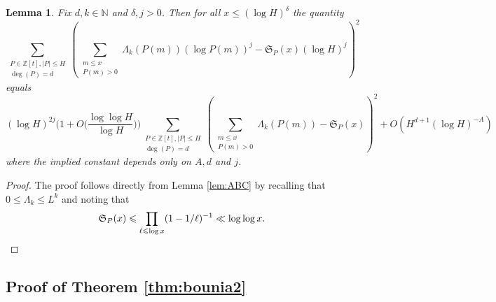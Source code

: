 \documentclass[reqno, 11pt]{amsart}
\numberwithin{equation}{section}
\newtheorem{lemma}[theorem]{Lemma}
\theoremstyle{definition}
\newcommand{\0}{\mathbf{0}}
\renewcommand{\leq}{\leqslant}
\renewcommand{\P}{\mathbb{P}}
\renewcommand{\leq}{\leqslant}
\renewcommand{\#}{\sharp}
\begin{document}
\begin{lemma}
\label{Davide Perez - Subvenite sancti dei}
Fix $d,k\in \mathbb N$ and $\delta,j>0$.  
Then for all $x\leq (\log H)^\delta$ 
the quantity 
$$
\sum_{\substack{ P\in \mathbb Z[t],|P|\leq H \\  \deg(P)=d}} 
\left( \sum_{\substack{ m\leq x\\P(m)>0} } \Lambda_k(P(m)) 
(\log P(m))^j - \mathfrak S_P(x) (\log H)^j\right)^2
$$equals 
$$  (\log H)^{2j}\Big( 1   +O\Big(\frac{\log \log H}{\log  H}
\Big)\Big)
\sum_{\substack{ P\in \mathbb Z[t],|P|\leq H \\  \deg(P)=d}} 
\left( \sum_{\substack{ m\leq x\\P(m)>0} } \Lambda_k(P(m)) 
  -\mathfrak S_P(x)  \right)^2 +O(H^{d+1} (\log H)^{-A} )
$$where the implied constant depends only on $A,d$ and $j$.
\end{lemma}
\begin{proof} The proof follows directly from 
Lemma \ref{lem:ABC} by recalling that $0\leq \Lambda_k \leq L^k$
and noting that \[
\mathfrak S_ P(x) \leq \prod_{\ell \leq \log x } (1-1/\ell)^{-1}
\ll \log \log x.\qedhere\]\end{proof}\subsection{Proof of Theorem 
\ref{thm:bounia2}} 
\end{document}
